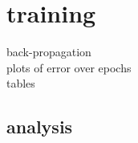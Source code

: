 
\section{training}
back-propagation\\
plots of error over epochs\\
tables\\

\subsection{analysis}
